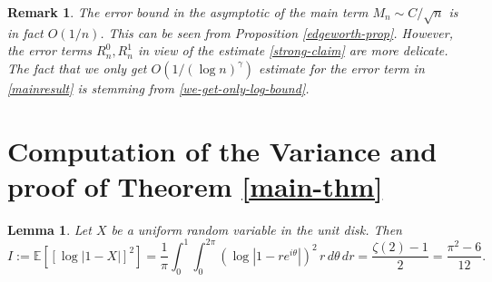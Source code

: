 \documentclass[9pt,a4paper,reqno]{amsart}
\theoremstyle{mine}
\newtheorem{Lemma}[thm]{Lemma}
\newtheorem{remark}[thm]{Remark}
\theoremstyle{definition}
\theoremstyle{remark}
\begin{document}
\begin{remark}
    The error bound in the asymptotic of the main term $M_n \sim C/\sqrt{n}$ is in fact $O(1/n)$. This can be seen from Proposition \ref{edgeworth-prop}. However, the error terms $R_n^0, R_n^1$ in view of the estimate \eqref{strong-claim} are more delicate. The fact that we only get $O(1/(\log n)^\gamma)$ estimate for the error term in \eqref{mainresult} is stemming from \eqref{we-get-only-log-bound}. 
\end{remark}
\vspace{1mm}

\section{Computation of the Variance and proof of Theorem \ref{main-thm}} \label{some-comp-last}

\begin{Lemma}\label{computation for exact asymptotics}
Let $X$ be a uniform random variable in the unit disk. Then 
    \begin{equation*}
I := \mathbb{E}\left[ [\log|1-X|]^2\right] = \frac{1}{\pi} \int_0^1 \int_0^{2\pi} \left( \log \left| 1 - r e^{i\theta} \right| \right)^2 \, r \, d\theta \, dr = \frac{\zeta(2) - 1}{2}= \frac{\pi^2 - 6}{12}.
\end{equation*}
\end{Lemma}
\end{document}
